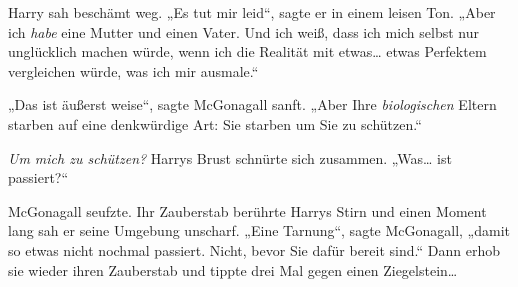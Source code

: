 Harry sah beschämt weg. „Es tut mir leid“, sagte er in einem leisen Ton. „Aber ich \emph{habe} eine Mutter und einen Vater. Und ich weiß, dass ich mich selbst nur unglücklich machen würde, wenn ich die Realität mit etwas… etwas Perfektem vergleichen würde, was ich mir ausmale.“

„Das ist äußerst weise“, sagte McGonagall sanft. „Aber Ihre \emph{biologischen} Eltern starben auf eine denkwürdige Art: Sie starben um Sie zu schützen.“

\emph{Um mich zu schützen?} Harrys Brust schnürte sich zusammen. „Was… ist passiert?“

McGonagall seufzte. Ihr Zauberstab berührte Harrys Stirn und einen Moment lang sah er seine Umgebung unscharf. „Eine Tarnung“, sagte McGonagall, „damit so etwas nicht nochmal passiert. Nicht, bevor Sie dafür bereit sind.“ Dann erhob sie wieder ihren Zauberstab und tippte drei Mal gegen einen Ziegelstein…

